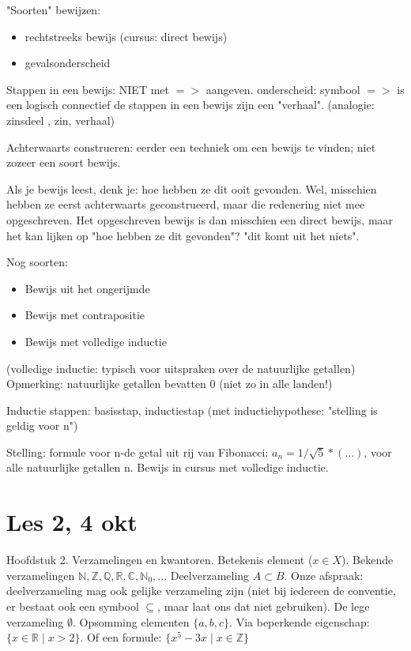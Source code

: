\documentclass{article}
\begin{document}
"Soorten" bewijzen: 
\begin{itemize}
    \item rechtstreeks bewijs (cursus: direct bewijs) 
    \item gevalsonderscheid
\end{itemize}


Stappen in een bewijs: NIET met $=>$ aangeven. 
onderscheid: 
symbool $=>$ is een logisch connectief 
de stappen in een bewijs zijn een "verhaal". 
(analogie: zinsdeel , zin, verhaal) 

Achterwaarts construeren: 
eerder een techniek om een bewijs te vinden; niet zozeer een soort bewijs. 

Als je bewijs leest, denk je: hoe hebben ze dit ooit gevonden. Wel, misschien hebben ze eerst achterwaarts geconstrueerd, maar die redenering niet mee opgeschreven. Het opgeschreven bewijs is dan misschien een direct bewijs, maar het kan lijken op "hoe hebben ze dit gevonden"? "dit komt uit het niets". 

Nog soorten: 
\begin{itemize}
    \item Bewijs uit het ongerijmde 
\item Bewijs met contrapositie
\item Bewijs met volledige inductie
\end{itemize}

(volledige inductie: typisch voor uitspraken over de natuurlijke getallen)
Opmerking: natuurlijke getallen bevatten 0 (niet zo in alle landen!) 

Inductie stappen: basisstap, inductiestap (met inductiehypothese: "stelling is geldig voor n")

Stelling: formule voor n-de getal uit rij van Fibonacci: $a_n = 1/\sqrt{5} * (...) $, voor alle natuurlijke getallen n. 
Bewijs in cursus met volledige inductie. 

\section{Les 2, 4 okt}

Hoofdstuk 2. Verzamelingen en kwantoren. Betekenis element ($x \in X$). Bekende verzamelingen $\mathbb{N}, \mathbb{Z}, \mathbb{Q}, \mathbb{R}, \mathbb{C}, \mathbb{N}_0, ... $
Deelverzameling $A \subset B$. Onze afspraak: deelverzameling mag ook gelijke verzameling zijn (niet bij iedereen de conventie, er bestaat ook een symbool $\subseteq$, maar laat ons dat niet gebruiken). De lege verzameling $\emptyset$. Opsomming elementen $\{a,b,c\}$. Via beperkende eigenschap: $\{x\in \mathbb{R} \mid x>2 \} $. Of een formule: $\{x^5 -3x  \mid  x \in \mathbb{Z} \} $
\end{document}
